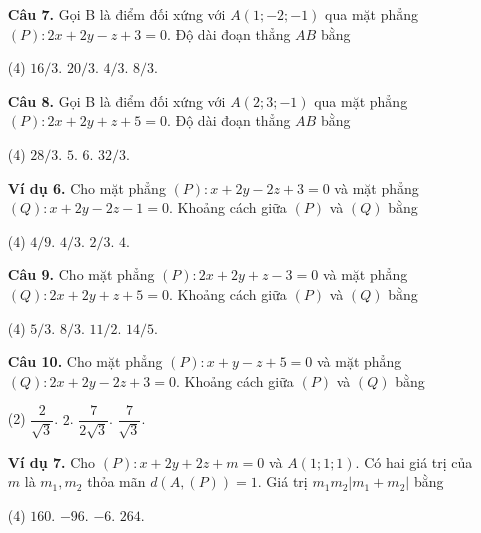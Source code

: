 \documentclass[12pt, a4paper]{article}
\begin{document}
\begin{enumerate}[label=\textbf{\arabic*.}, wide=0pt, leftmargin=*]
    \item[\textbf{Câu 7.}] Gọi B là điểm đối xứng với \(A(1;-2;-1)\) qua mặt phẳng \((P) : 2x + 2y - z + 3 = 0\). Độ dài đoạn thẳng \(AB\) bằng
    \begin{tasks}(4)
        \task \(16/3\).
        \task \(20/3\).
        \task \(4/3\).
        \task \(8/3\).
    \end{tasks}
    
    \item[\textbf{Câu 8.}] Gọi B là điểm đối xứng với \(A(2;3;-1)\) qua mặt phẳng \((P) : 2x + 2y + z + 5 = 0\). Độ dài đoạn thẳng \(AB\) bằng
    \begin{tasks}(4)
        \task \(28/3\).
        \task \(5\).
        \task \(6\).
        \task \(32/3\).
    \end{tasks}

    \item[\textbf{Ví dụ 6.}] Cho mặt phẳng \((P) : x + 2y - 2z + 3 = 0\) và mặt phẳng \((Q) : x + 2y - 2z - 1 = 0\). Khoảng cách giữa \((P)\) và \((Q)\) bằng
    \begin{tasks}(4)
        \task \(4/9\).
        \task \(4/3\).
        \task \(2/3\).
        \task \(4\).
    \end{tasks}
    
    \item[\textbf{Câu 9.}] Cho mặt phẳng \((P) : 2x + 2y + z - 3 = 0\) và mặt phẳng \((Q) : 2x + 2y + z + 5 = 0\). Khoảng cách giữa \((P)\) và \((Q)\) bằng
    \begin{tasks}(4)
        \task \(5/3\).
        \task \(8/3\).
        \task \(11/2\).
        \task \(14/5\).
    \end{tasks}
    
    \item[\textbf{Câu 10.}] Cho mặt phẳng \((P) : x + y - z + 5 = 0\) và mặt phẳng \((Q) : 2x + 2y - 2z + 3 = 0\). Khoảng cách giữa \((P)\) và \((Q)\) bằng
    \begin{tasks}(2)
        \task \(\dfrac{2}{\sqrt{3}}\).
        \task \(2\).
        \task \(\dfrac{7}{2\sqrt{3}}\).
        \task \(\dfrac{7}{\sqrt{3}}\).
    \end{tasks}
    
    \item[\textbf{Ví dụ 7.}] Cho \((P): x + 2y + 2z + m = 0\) và \(A(1;1;1)\). Có hai giá trị của \(m\) là \(m_1, m_2\) thỏa mãn \(d(A, (P)) = 1\). Giá trị \(m_1 m_2 |m_1 + m_2|\) bằng
    \begin{tasks}(4)
        \task \(160\).
        \task \(-96\).
        \task \(-6\).
        \task \(264\).
    \end{tasks}
    

\end{enumerate}
\end{document}
